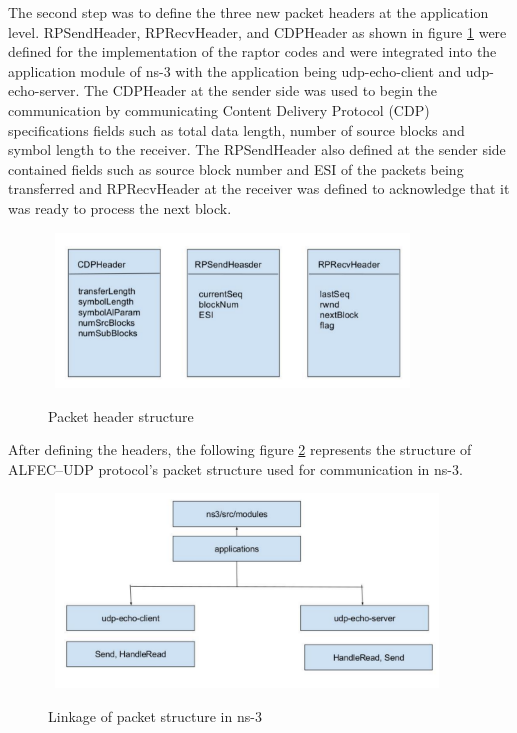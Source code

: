The second step was to define the three new packet headers at the application level. RPSendHeader, RPRecvHeader, and CDPHeader as shown in figure \ref{hdrs} were defined for the implementation of the raptor codes and were integrated into the application module of ns-3 with the application being udp-echo-client and udp-echo-server. The CDPHeader at the sender side was used to begin the communication by communicating Content Delivery Protocol (CDP) specifications fields such as total data length, number of source blocks and symbol length to the receiver. The RPSendHeader also defined at the sender side contained fields such as source block number and ESI of the packets being transferred and RPRecvHeader at the receiver was defined to acknowledge that it was ready to process the next block.
\begin{figure}[h!] 
\begin{center}
\mbox{
\includegraphics[width=3.7in]{Figures/hdr}}
\caption{Packet header structure}
\label{hdrs}
\end{center}
\end{figure}

After defining the headers, the following figure \ref{app} represents the structure of ALFEC--UDP protocol's packet structure used for communication in ns-3.
\begin{figure}[!htbp] 
\begin{center}
\mbox{
\includegraphics[width=4.0in]{Figures/app}}
\caption{Linkage of packet structure in ns-3}
\label{app}
\end{center}
\end{figure}

